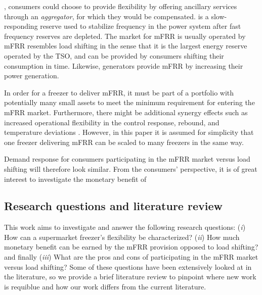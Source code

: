 , consumers could choose to provide flexibility by offering ancillary services through an \textit{aggregator}, for which they would be compensated. 
is a slow-responding reserve used to stabilize frequency in the power system after fast frequency reserves are depleted. The market for mFRR is usually operated by  mFRR resembles load shifting in the sense that it is the largest energy reserve operated by the TSO, and can be provided by consumers  shifting their consumption in time. Likewise, generators provide mFRR by increasing their power generation.

In order for a freezer to deliver mFRR, it must be part of a  portfolio with potentially many small assets to meet the minimum  requirement for entering the mFRR market.  Furthermore, there might be additional synergy effects such as increased operational flexibility in the control response, rebound, and temperature deviations \cite{koch2011modeling}. However, in this paper it is assumed for simplicity that one freezer delivering mFRR can be scaled to many freezers in the same way.

Demand response for consumers participating in the mFRR market versus load shifting will therefore look similar. From the consumers' perspective, it is of great interest to investigate the monetary benefit of 

\vspace{-1mm}
\subsection{Research questions and literature review}
%
This work aims to investigate and answer the following research questions: (\textit{i}) How can a supermarket freezer's flexibility be characterized? (\textit{ii}) How much monetary benefit can be earned by the mFRR provision opposed to load shifting? and finally (\textit{iii})
What are the pros and cons of participating in the mFRR market versus load shifting? Some of these questions have been extensively looked at  in the literature, so we provide a brief literature review to pinpoint where new work is requiblue and how our work differs from the current literature.



